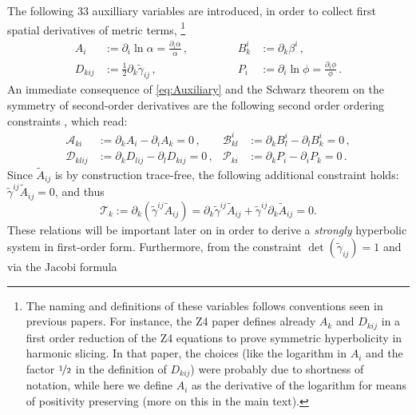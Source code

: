 The following 33 auxilliary variables are introduced, in order to collect
first spatial derivatives of metric terms,
\footnote{
   The naming and definitions 
   of these variables follows conventions seen in previous papers.
   For instance, the Z4 paper \cite{Bona:2003fj} defines already
   $A_k$ and $D_{kij}$ in a first order reduction of the Z4 equations
   to prove symmetric hyperbolicity in harmonic slicing. In that paper,
   the choices (like the logarithm in $A_i$ and the factor $\nicefrac 12$ in
   the definition of $D_{kij}$) were probably due to shortness of notation,
   while here we define $A_i$ as the derivative of the logarithm for means
   of positivity preserving (more on this in the main text).
}
%
\begin{equation}
\begin{aligned}
\label{eq:Auxiliary}
A_i &:= \partial_i\ln\alpha = \frac{\partial_i \alpha }{\alpha}\,, \qquad
&&&
B_k^{i} &:= \partial_k\beta^i\,,
\\
D_{kij} &:= \frac{1}{2}\partial_k\tilde\gamma_{ij}\,, \qquad
&&&
P_i       &:= \partial_i\ln\phi = \frac{\partial_i \phi}{\phi}\,.
\end{aligned}
\end{equation}
%
An immediate consequence of \eqref{eq:Auxiliary} and the Schwarz theorem
on the symmetry of second-order derivatives are the following second
order ordering constraints \cite{Gundlach:2005ta}, which read:
\begin{align}
\label{eqn.second.ord.const}
 \mathcal{A}_{ki}   &:= \partial_k A_i - \partial _i A_k        = 0\,, &
 \mathcal{B}_{kl}^i &:= \partial_k B_l^i - \partial_l B_k^i     = 0\,, \nonumber \\
 \mathcal{D}_{klij} &:= \partial_k D_{lij} - \partial_l D_{kij} = 0\,, &
 \mathcal{P}_{ki} &:= \partial_k P_i - \partial _i P_k = 0\,.
\end{align}
%
Since $\tilde{A}_{ij}$ is by construction trace-free, the following
additional constraint holds: $\tilde{\gamma}^{ij} \tilde{A}_{ij} = 0$,
and thus
\begin{equation}
\label{atf.diff}
\mathcal{T}_k := \partial_k \left( \tilde{\gamma}^{ij} \tilde{A}_{ij} \right) = \partial_k \tilde{\gamma}^{ij} \tilde{A}_{ij} + \tilde{\gamma}^{ij} \partial_k \tilde{A}_{ij} = 0. 
\end{equation}
These relations will be important later on in order to derive a
\textit{strongly} hyperbolic system in first-order form.
%
Furthermore, from the constraint $\det(\tilde{\gamma}_{ij}) =1$ and via
the Jacobi formula
